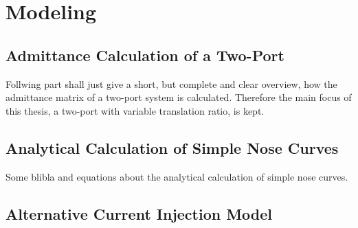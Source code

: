 
\chapter{Modeling}

\section{Admittance Calculation of a Two-Port}
\label{app:admittance-deduction}

Follwing part shall just give a short, but complete and clear overview, how the admittance matrix of a two-port system is calculated.
Therefore the main focus of this thesis, a two-port with variable translation ratio, is kept.

\section{Analytical Calculation of Simple Nose Curves}
\label{app:analytical-nose-curve}

Some blibla and equations about the analytical calculation of simple nose curves.


\section{Alternative Current Injection Model}
\label{app:current-injection-model}


